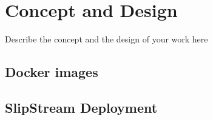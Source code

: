 \chapter{Concept and Design}
\label{cha:conceptanddesign}

Describe the concept and the design of your work here

\section{Docker images}
\section{SlipStream Deployment}
